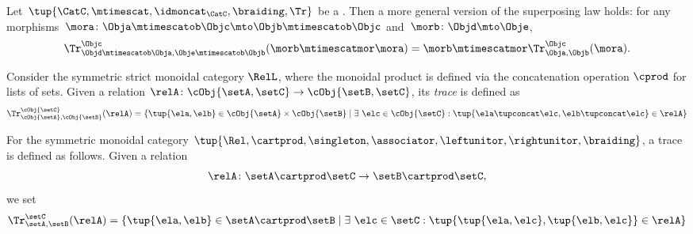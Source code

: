 \begin{lemma}
    \label{lem:general-superposing-law}
    Let~$\tup{\CatC, \mtimescat,\idmoncat_{\CatC}, \braiding, \Tr}$ be a .
    Then a more general version of the superposing law holds: for any morphisms~$\mora\colon \Obja\mtimescatob \Objc \mto \Objb \mtimescatob \Objc$ and~$\morb \colon \Objd \mto \Obje$,
    \begin{equation}
        \label{eq:superposing_2}
        \Tr_{\Objd\mtimescatob \Obja,\Obje\mtimescatob \Objb}^{\Objc}(\morb \mtimescatmor \mora)=\morb \mtimescatmor \Tr_{\Obja,\Objb}^\Objc(\mora).
    \end{equation}
\end{lemma}




\begin{definition}
    \label{def:tuple-REL-trace}
    Consider the symmetric strict monoidal category $\RelL$, where the monoidal product is defined via the concatenation operation $\cprod$ for lists of sets.
    Given a relation $\relA \colon \cObj{\setA, \setC}  \to \cObj{\setB, \setC}$, its \emph{trace} is defined as
    \begin{equation}
        \label{eq:tupel-REL-tracedef}
        \begin{aligned}
            \Tr_{\cObj{\setA}, \cObj{\setB}}^{\cObj{\setC}}(\relA) = \{ \tup{\ela, \elb} \in \cObj{\setA} \times \cObj{\setB} \mid \exists \ \elc \in \cObj{\setC} : \tup{\ela \tupconcat \elc, \elb \tupconcat \elc} \in \relA \}
        \end{aligned}
    \end{equation}
\end{definition}

\begin{definition}
For the symmetric monoidal category $\tup{\Rel, \cartprod, \singleton, \associator, \leftunitor, \rightunitor, \braiding}$, a trace is defined as follows. Given a relation
\begin{equation}
\relA \colon \setA \cartprod \setC \to \setB \cartprod \setC,
\end{equation}
we set
\begin{equation}
\Tr_{\setA,\setB}^\setC (\relA) = \{ \tup{\ela, \elb} \in \setA \cartprod \setB \mid \exists \ \elc \in \setC : \tup{\tup{\ela, \elc}, \tup{\elb, \elc}} \in \relA \}
\end{equation}
\end{definition}

